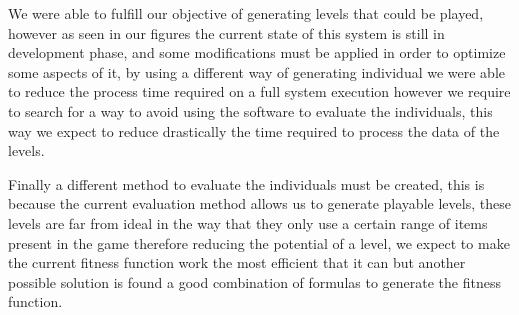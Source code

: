 \documentclass[conference]{IEEEtran}
\begin{document}
    We were able to fulfill our objective of generating levels that could be played, 
    however as seen in our figures the current state of this system is still in development 
    phase, and some modifications must be applied in order to optimize some aspects of it, 
    by using a different way of generating individual we were able to reduce the process 
    time required on a full system execution however we require to search for a way to 
    avoid using the software to evaluate the individuals, this way we expect to reduce 
    drastically the time required to process the data of the levels. 
    
    Finally a different method to evaluate the individuals must be created, this is
    because the current evaluation method allows us to generate playable levels,
    these levels are far from ideal in the way that they only use a certain range of
    items present in the game therefore reducing the potential of a level, we expect
    to make the current fitness function work the most efficient that it can but
    another possible solution is found a good combination of formulas to generate
    the fitness function.



\end{document}
